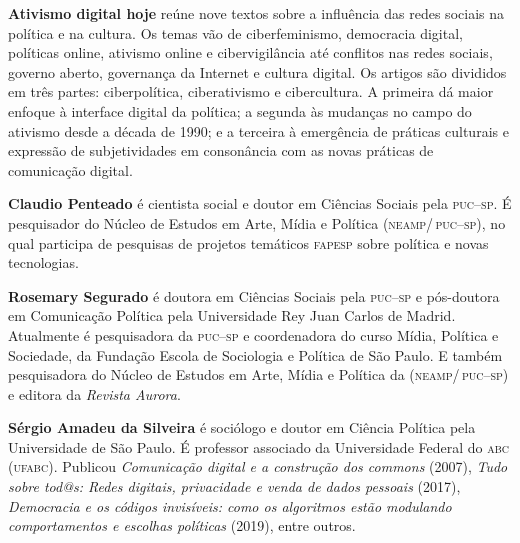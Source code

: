 \textbf{Ativismo digital hoje} reúne nove textos sobre a influência das redes sociais na política e na cultura. Os temas vão de ciberfeminismo, democracia digital, políticas online, ativismo online e cibervigilância até conflitos nas redes sociais, governo aberto, governança da Internet e cultura digital.
Os artigos são divididos em três partes: ciberpolítica, ciberativismo e cibercultura. A primeira dá maior enfoque à interface digital da política; a segunda às mudanças no campo do ativismo desde a década de 1990; e a terceira à emergência de práticas culturais e expressão de subjetividades em consonância com as novas práticas de comunicação digital.

\textbf{Claudio Penteado} é cientista social e doutor em Ciências Sociais pela \textsc{puc--sp}. É pesquisador do Núcleo de Estudos em Arte, Mídia e Política (\textsc{neamp/\,puc--sp}), no qual participa de pesquisas de projetos temáticos \textsc{fapesp} sobre política e novas tecnologias.

\textbf{Rosemary Segurado} é doutora em Ciências Sociais pela \textsc{puc--sp} e pós-doutora em Comunicação Política pela Universidade Rey Juan Carlos de Madrid. Atualmente é pesquisadora da \textsc{puc--sp} e coordenadora do curso Mídia, Política e Sociedade, da Fundação Escola de Sociologia e Política de São Paulo. 
E também pesquisadora do Núcleo de Estudos em Arte, Mídia e Política da (\textsc{neamp/\,puc--sp}) e editora da \textit{Revista Aurora}.

\textbf{Sérgio Amadeu da Silveira} é sociólogo e doutor em Ciência Política pela Universidade de São Paulo. É professor associado da Universidade Federal do \textsc{abc} (\textsc{ufabc}). Publicou \textit{Comunicação digital e a construção dos commons} (2007), \textit{Tudo sobre tod@s: Redes digitais, privacidade e venda de dados pessoais} (2017), \textit{Democracia e os códigos invisíveis: como os algoritmos estão modulando comportamentos e escolhas políticas} (2019), entre outros.

